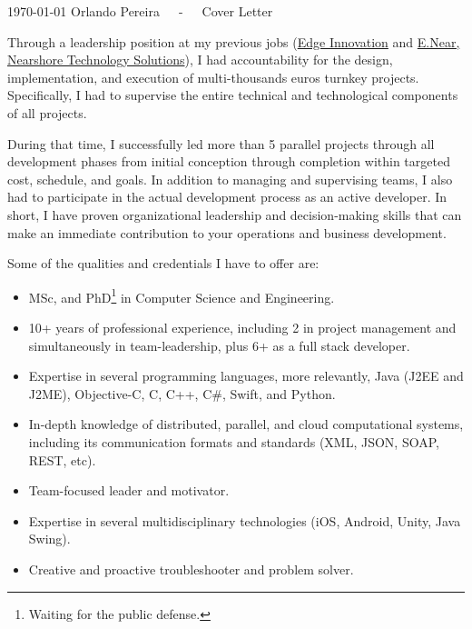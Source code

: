 \documentclass[11pt, a4paper]{awesome-cv}
\begin{document}
\makecvheader

\makecvfooter
  {\today}
  {Orlando Pereira~~~-~~~Cover Letter}
  {}

\makelettertitle

\begin{cvletter}


Through a leadership position at my previous jobs
(\href{http://edgeinnovation.eu}{Edge Innovation} and \href{http://www.enear.co}{E.Near, Nearshore Technology Solutions}),
I had accountability for the design, implementation, and execution of multi-thousands euros turnkey projects.
Specifically, I had to supervise the entire technical and technological components of all projects.


During that time, I successfully led more than 5 parallel projects through all development phases from initial 
conception through completion within targeted cost, schedule, and goals.
In addition to managing and supervising teams, I also had to participate in the actual development process as an active developer.
In short, I have proven organizational leadership and decision-making skills that can make an immediate contribution to your operations and business development.



Some of the qualities and credentials I have to offer are:
\begin{itemize}
	\item MSc, and PhD\footnote{Waiting for the public defense.} in Computer Science and Engineering.
	\item 10+ years of professional experience, including 2 in project management and simultaneously in team-leadership, plus 6+ as a full stack developer.
	\item Expertise in several programming languages, more relevantly, Java (J2EE and J2ME), Objective-C, C, C++, C\#, Swift, and Python.
	\item In-depth knowledge of distributed, parallel, and cloud computational systems, including its communication formats and standards (XML, JSON, SOAP, REST, etc).
	\item Team-focused leader and motivator.	
	\item Expertise in several multidisciplinary technologies (iOS, Android, Unity, Java Swing).
	\item Creative and proactive troubleshooter and problem solver.
\end{itemize}




\end{cvletter}
\end{document}
